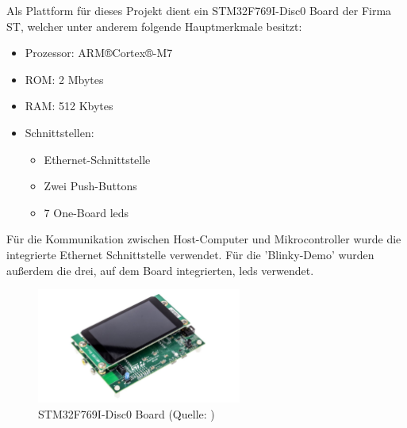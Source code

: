\documentclass[../EDF Master Thesis.tex]{subfiles}
\begin{document}
Als Plattform für dieses Projekt dient ein STM32F769I-Disc0 Board der Firma ST, welcher unter anderem folgende Hauptmerkmale besitzt:

\begin{itemize}
    \item Prozessor: ARM®Cortex®-M7
    \item ROM: 2 Mbytes
    \item RAM: 512 Kbytes
    \item Schnittstellen:
    \begin{itemize}
        \item Ethernet-Schnittstelle
        \item Zwei Push-Buttons
        \item 7 One-Board \ac{led}s
    \end{itemize}
\end{itemize}

Für die Kommunikation zwischen Host-Computer und Mikrocontroller wurde die integrierte Ethernet Schnittstelle verwendet.
Für die 'Blinky-Demo' wurden außerdem die drei, auf dem Board integrierten, \ac{led}s verwendet.

\begin{figure}[ht!]
    \begin{center}
        \includegraphics[width=0.6\textwidth]{attachments/stm32f769i-disc0.pdf}
    \end{center}
    \caption[STM32F769I-Disc0 Board]{STM32F769I-Disc0 Board (Quelle: \cite{stm:001})}
    \label{fig:STM32F769I-Disc0_board}
\end{figure}
\end{document}

